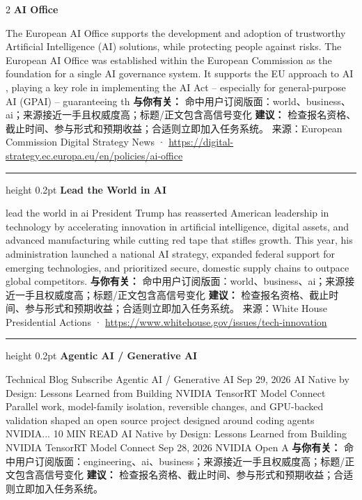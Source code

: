 \documentclass[10.5pt]{ctexart}
\begin{document}
\begin{multicols}{2}
{\large\bfseries AI Office}\par
The European AI Office supports the development and adoption of trustworthy Artificial Intelligence (AI) solutions, while protecting people against risks. The European AI Office was established within the European Commission as the foundation for a single AI governance system. It supports the EU approach to AI , playing a key role in implementing the AI Act – especially for general-purpose AI (GPAI) – guaranteeing th
\textbf{与你有关：} 命中用户订阅版面：world、business、ai；来源接近一手且权威度高；标题/正文包含高信号变化
\textbf{建议：} 检查报名资格、截止时间、参与形式和预期收益；合适则立即加入任务系统。
{\footnotesize\color{ormuted} 来源：European Commission Digital Strategy News · \url{https://digital-strategy.ec.europa.eu/en/policies/ai-office}}
\vspace{2mm}
\hrule height 0.2pt
\vspace{2mm}
{\large\bfseries Lead the World in AI}\par
lead the world in ai President Trump has reasserted American leadership in technology by accelerating innovation in artificial intelligence, digital assets, and advanced manufacturing while cutting red tape that stifles growth. This year, his administration launched a national AI strategy, expanded federal support for emerging technologies, and prioritized secure, domestic supply chains to outpace global competitors.
\textbf{与你有关：} 命中用户订阅版面：world、business、ai；来源接近一手且权威度高；标题/正文包含高信号变化
\textbf{建议：} 检查报名资格、截止时间、参与形式和预期收益；合适则立即加入任务系统。
{\footnotesize\color{ormuted} 来源：White House Presidential Actions · \url{https://www.whitehouse.gov/issues/tech-innovation}}
\vspace{2mm}
\hrule height 0.2pt
\vspace{2mm}
{\large\bfseries Agentic AI / Generative AI}\par
Technical Blog Subscribe Agentic AI / Generative AI Sep 29, 2026 AI Native by Design: Lessons Learned from Building NVIDIA TensorRT Model Connect Parallel work, model-family isolation, reversible changes, and GPU-backed validation shaped an open source project designed around coding agents NVIDIA... 10 MIN READ AI Native by Design: Lessons Learned from Building NVIDIA TensorRT Model Connect Sep 28, 2026 NVIDIA Open A
\textbf{与你有关：} 命中用户订阅版面：engineering、ai、business；来源接近一手且权威度高；标题/正文包含高信号变化
\textbf{建议：} 检查报名资格、截止时间、参与形式和预期收益；合适则立即加入任务系统。

\end{multicols}
\end{document}
